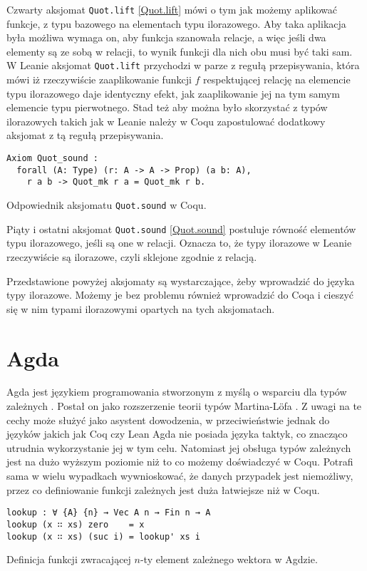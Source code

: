 Czwarty aksjomat \texttt{Quot.lift} \ref{Quot.lift} mówi o tym jak możemy aplikować funkcje, z typu bazowego na elementach typu ilorazowego. Aby taka aplikacja była możliwa wymaga on, aby funkcja szanowała relacje, a więc jeśli dwa elementy są ze sobą w relacji, to wynik funkcji dla nich obu musi być taki sam. W Leanie aksjomat \texttt{Quot.lift} przychodzi w parze z regułą przepisywania, która mówi iż rzeczywiście zaaplikowanie funkcji $f$ respektującej relację na elemencie typu ilorazowego daje identyczny efekt, jak zaaplikowanie jej na tym samym elemencie typu pierwotnego. Stad też aby można było skorzystać z typów ilorazowych takich jak w Leanie należy w Coqu zapostulować dodatkowy aksjomat z tą regułą przepisywania. 
\begin{code}
\begin{verbatim}
Axiom Quot_sound :
  forall (A: Type) (r: A -> A -> Prop) (a b: A),
    r a b -> Quot_mk r a = Quot_mk r b.
\end{verbatim}
\caption{Odpowiednik aksjomatu \texttt{Quot.sound} w Coqu.}
\label{Quot.sound}
\end{code}

Piąty i ostatni aksjomat \texttt{Quot.sound} \ref{Quot.sound} postuluje równość elementów typu ilorazowego, jeśli są one w relacji. Oznacza to, że typy ilorazowe w Leanie rzeczywiście są ilorazowe, czyli sklejone zgodnie z relacją.

Przedstawione powyżej aksjomaty są wystarczające, żeby wprowadzić do języka typy ilorazowe. Możemy je bez problemu również wprowadzić do Coqa i cieszyć się w nim typami ilorazowymi opartych na tych aksjomatach.
\section{Agda}
Agda jest językiem programowania stworzonym z myślą o wsparciu dla typów zależnych \cite{agda}. Postał on jako rozszerzenie teorii typów Martina-Löfa \cite{MARTINLOF197573}. Z uwagi na te cechy może służyć jako asystent dowodzenia, w przeciwieństwie jednak do języków jakich jak Coq czy Lean Agda nie posiada języka taktyk, co znacząco utrudnia wykorzystanie jej w tym celu. Natomiast jej obsługa typów zależnych jest na dużo wyższym poziomie niż to co możemy doświadczyć w Coqu. Potrafi sama w wielu wypadkach wywnioskować, że danych przypadek jest niemożliwy, przez co definiowanie funkcji zależnych jest duża łatwiejsze niż w Coqu.
\begin{code}
\begin{verbatim}
lookup : ∀ {A} {n} → Vec A n → Fin n → A
lookup (x ∷ xs) zero    = x
lookup (x ∷ xs) (suc i) = lookup' xs i
\end{verbatim}
\caption{Definicja funkcji zwracającej $n$-ty element zależnego wektora w Agdzie.}
\label{agda-lookup}
\end{code}
